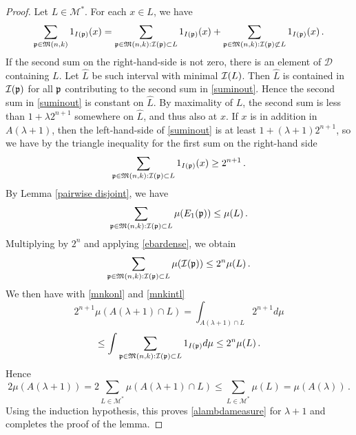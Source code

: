 \begin{proof}
Let $L\in \mathcal{M}^*$. For each $x\in L$, we have
\begin{equation}\label{suminout}
 \sum_{\fp \in {\mathfrak{M}}(n,k)} 1_{I(\fp)}(x)=
   \sum_{\fp \in {\mathfrak{M}}(n,k):\sc(\fp) \subset L} 1_{I(\fp)}(x)+
  \sum_{\fp \in {\mathfrak{M}}(n,k):\sc(\fp) \not \subset L} 1_{I(\fp)}(x)\, .
\end{equation}
If the second sum on the right-hand-side is not zero, there is
an element of $\mathcal{D}$  containing $L$.
Let $\hat{L}$ be such  interval with minimal $\sc(L)$. Then $\hat{L}$ is contained in $\sc(\fp)$ for all $\fp$
contributing to the second sum in
\eqref{suminout}.
Hence the second sum in \eqref{suminout} is constant on
$\hat{L}$.
By maximality of $L$, the second sum is less than  $1+\lambda 2^{n+1}$ somewhere on $\hat{L}$, and thus also
at $x$.
If $x$ is in addition in $A(\lambda+1)$, then
the left-hand-side of \eqref{suminout} is at least
$1+(\lambda+1) 2^{n+1}$, so we have by the triangle inequality for the first sum on the right-hand side
\begin{equation}\label{mnkonl}
\sum_{\fp \in {\mathfrak{M}}(n,k):\sc(\fp) \subset L} 1_{I(\fp)}(x)\ge 2^{n+1}\, .\end{equation}
By Lemma \ref{pairwise disjoint}, we have
\begin{equation}
\sum_{\fp \in {\mathfrak{M}}(n,k):\sc(\fp) \subset L} \mu({E_1}(\fp)) \leq \mu(L)\, .
\end{equation}
Multiplying by $2^n$ and applying  \eqref{ebardense}, we obtain
\begin{equation}\label{mnkintl}
    \sum_{\fp \in {\mathfrak{M}}(n,k):\sc(\fp) \subset L} \mu(\sc(\fp))  \leq 2^n \mu(L)\, .
\end{equation}
We then have with \eqref{mnkonl} and \eqref{mnkintl}
\begin{equation}
2^{n+1}\mu(A(\lambda+1)\cap L) =
 \int_{A(\lambda+1)\cap L} 2^{n+1} d\mu
\end{equation}
\begin{equation}
\le
    \int \sum_{\fp \in {\mathfrak{M}}(n,k):\sc(\fp) \subset L} 1_{I(\fp)} d\mu
\le 2^n \mu(L)\, .
\end{equation}
Hence
\begin{equation}
    2\mu(A(\lambda+1))=2\sum_{L\in \mathcal{M}^*}
\mu(A(\lambda+1)\cap L)\le
\sum_{L\in \mathcal{M}^*}\mu( L)= \mu(A(\lambda))\, .
\end{equation}
Using the induction hypothesis, this proves
\eqref{alambdameasure} for $\lambda+1$ and completes the proof of the lemma.
\end{proof}

